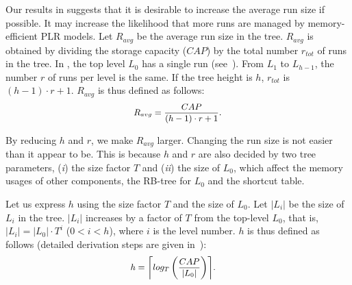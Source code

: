Our results in  suggests that
it is desirable to increase the average run size if possible.
It may increase the likelihood that more runs are managed 
by memory-efficient PLR models.
Let $R_{avg}$ be the average run size in the tree.
$R_{avg}$ is obtained by dividing the storage capacity ($CAP$)
by the total number $r_{tot}$ of runs in the tree. In \ours{}, the
top level $L_0$ has a single run (see~). From $L_1$ to $L_{h-1}$, the
number $r$ of runs per level is the same. If the tree height is
$h$, $r_{tot}$ is $(h-1) \cdot r + 1$. 
$R_{avg}$ is thus defined as follows:
\begin{equation}
\small
\begin{split}
	R_{avg}=\frac{CAP}{(h-1) \cdot r + 1}.
\end{split}
\label{eq:r_avg_original}
\end{equation}

By reducing $h$ and $r$, we make $R_{avg}$ larger. 
Changing the run size is not easier than it appear to be.
This is because $h$ and $r$ are also decided by two tree parameters,
(\textit{i}) the size factor $T$ and (\textit{ii}) the size of $L_{0}$, 
which affect the memory usages of other components, 
the RB-tree for $L_0$ and the shortcut table.



Let us express $h$ using the size factor $T$ and the size of $L_0$.
Let $|L_i|$ be the size of $L_i$ in the tree.
$|L_i|$ increases by a factor of $T$ from the
top-level $L_0$, that is, $|L_{i}| = |L_0| \cdot T^{i}$ ($0<i<h$), where $i$ is
the level number.  $h$ 
is thus defined as follows (detailed derivation steps are given in~\cite{monkey}):
\begin{equation}
\small
\begin{split}
	h &= \ceil*{log_{T}\left(\frac{CAP}{|L_0|} \right)}.
\end{split}
\label{eq:n_level}
\end{equation}

